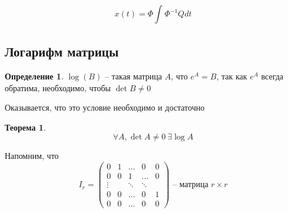 \documentclass[a4paper]{article}
\theoremstyle{indented}
\newtheorem*{theorem}{Теорема}
\theoremstyle{definition}
\newtheorem*{defn}{Определение}
\theoremstyle{remark}
\begin{document}
\[x(t) = \Phi \int_{}^{}\Phi^{-1}Qdt\]

\subsection{Логарифм матрицы}

\begin{defn}
   $\log(B) $ -- такая матрица $A$, что $e^A = B$, так как $e^A$ всегда обратима, необходимо, чтобы $\det B \neq 0$
\end{defn}
Оказывается, что это условие необходимо и достаточно

\begin{theorem}
  \[\forall A, \det A \neq 0\ \exists \log A\]
\end{theorem}

Напомним, что
\[I_r =
   \begin{pmatrix}
    0 & 1 & \ldots & 0 & 0 \\
    0 & 0 & 1 & \ldots & 0 \\
    \vdots & & \ddots & \ddots & \\
    0 & 0 & \ldots & 0 & 1\\
    0 & 0 & \ldots & 0 & 0
  \end{pmatrix}
  \text{ -- матрица }r \times r\]
\end{document}
